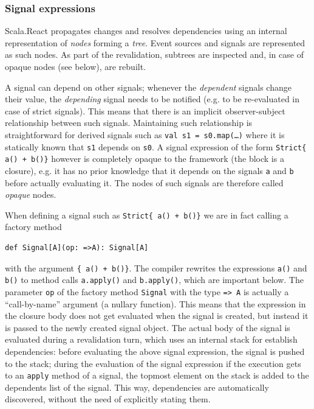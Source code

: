 \subsubsection{Signal expressions}

Scala.React propagates changes and resolves dependencies using an internal representation of \emph{nodes} forming a \emph{tree}. Event sources and signals are represented as such nodes. As part of the revalidation, subtrees are inspected and, in case of opaque nodes (see below), are rebuilt.

A signal can depend on other signals; whenever the \emph{dependent} signals change their value, the \emph{depending} signal needs to be notified (e.g. to be re-evaluated in case of strict signals). This means that there is an implicit observer-subject relationship between such signals. Maintaining such relationship is straightforward for derived signals such as \texttt{val s1 = s0.map(\dots)} where it is statically known that \texttt{s1} depends on \texttt{s0}. A signal expression of the form \texttt{Strict\{ a() + b()\}} however is completely opaque to the framework (the block is a closure), e.g. it has no prior knowledge that it depends on the signals \texttt{a} and \texttt{b} before actually evaluating it. The nodes of such signals are therefore called \emph{opaque} nodes.

When defining a signal such as \texttt{Strict\{ a() + b()\}} we are in fact calling a factory method 
\begin{lstlisting}
def Signal[A](op: =>A): Signal[A]
\end{lstlisting}
with the argument \texttt{\{ a() + b()\}}. The compiler rewrites the expressions \texttt{a()} and \texttt{b()} to method calls \texttt{a.apply()} and \texttt{b.apply()}, which are important below. The parameter \texttt{op} of the factory method \texttt{Signal} with the type \texttt{=> A} is actually a ``call-by-name'' argument (a nullary function). This means that the expression in the closure body does not get evaluated when the signal is created, but instead it is passed to the newly created signal object. The actual body of the signal is evaluated during a revalidation turn, which uses an internal stack for establish dependencies: before evaluating the above signal expression, the signal is pushed to the stack; during the evaluation of the signal expression if the execution gets to an \texttt{apply} method of a signal, the topmost element on the stack is added to the dependents list of the signal. This way, dependencies are automatically discovered, without the need of explicitly stating them.

